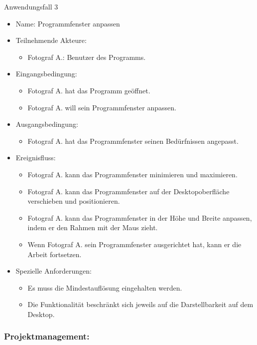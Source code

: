 \begin{description}
	\item[Anwendungsfall 3]
	\end{description}
	
	\begin{itemize}
		\item Name: Programmfenster anpassen
		\item Teilnehmende Akteure:
		\begin{itemize}
			\item	Fotograf A.: Benutzer des Programms.
		\end{itemize}
		\item Eingangsbedingung:
		\begin{itemize}
			\item Fotograf A. hat das Programm geöffnet.
			\item Fotograf A. will sein Programmfenster anpassen.						
		\end{itemize}
		\item Ausgangsbedingung:
		\begin{itemize}
			\item	Fotograf A. hat das Programmfenster seinen Bedürfnissen angepasst.		
		\end{itemize}
		\item Ereignisfluss:	
		\begin{itemize}
			\item Fotograf A. kann das Programmfenster minimieren und maximieren.
			\item Fotograf A. kann das Programmfenster auf der Desktopoberfläche verschieben und positionieren.
			\item Fotograf A. kann das Programmfenster in der Höhe und Breite anpassen, indem er den Rahmen mit der Maus zieht.
			\item Wenn Fotograf A. sein Programmfenster ausgerichtet hat, kann er die Arbeit fortsetzen.
		\end{itemize}
		\item Spezielle Anforderungen:
		\begin{itemize}
			\item	Es muss die Mindestauflösung eingehalten werden.
			\item Die Funktionalität beschränkt sich jeweils auf die Darstellbarkeit auf dem Desktop.
		\end{itemize}
	\end{itemize}	
	
	\subsubsection{Projektmanagement:}
		
